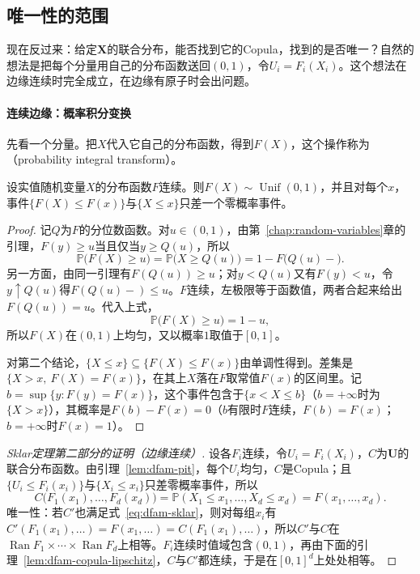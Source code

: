 \subsection{唯一性的范围}
\label{sec:dfam-copula-uniqueness}

现在反过来：给定$\bm{X}$的联合分布，能否找到它的Copula，找到的是否唯一？自然的想法是把每个分量用自己的分布函数送回$(0,1)$，令$U_i=F_i(X_i)$。这个想法在边缘连续时完全成立，在边缘有原子时会出问题。

\paragraph{连续边缘：概率积分变换}
先看一个分量。把$X$代入它自己的分布函数，得到$F(X)$，这个操作称为（probability integral transform）。

\begin{lemma}[概率积分变换]
\label{lem:dfam-pit}
设实值随机变量$X$的分布函数$F$连续。则$F(X)\sim\operatorname{Unif}(0,1)$，并且对每个$x$，事件$\{F(X)\leq F(x)\}$与$\{X\leq x\}$只差一个零概率事件。
\end{lemma}

\begin{proof}
记$Q$为$F$的分位数函数。对$u\in(0,1)$，由第~\ref{chap:random-variables}章的引理，$F(y)\geq u$当且仅当$y\geq Q(u)$，所以
\[
  \mathbb{P}\bigl(F(X)\geq u\bigr)=\mathbb{P}\bigl(X\geq Q(u)\bigr)=1-F\bigl(Q(u)-\bigr).
\]
另一方面，由同一引理有$F(Q(u))\geq u$；对$y<Q(u)$又有$F(y)<u$，令$y\uparrow Q(u)$得$F(Q(u)-)\leq u$。$F$连续，左极限等于函数值，两者合起来给出$F(Q(u))=u$。代入上式，
\[
  \mathbb{P}\bigl(F(X)\geq u\bigr)=1-u ,
\]
所以$F(X)$在$(0,1)$上均匀，又以概率$1$取值于$[0,1]$。

对第二个结论，$\{X\leq x\}\subseteq\{F(X)\leq F(x)\}$由单调性得到。差集是$\{X>x,\ F(X)=F(x)\}$，在其上$X$落在$F$取常值$F(x)$的区间里。记$b=\sup\{y:F(y)=F(x)\}$，这个事件包含于$\{x<X\leq b\}$（$b=+\infty$时为$\{X>x\}$），其概率是$F(b)-F(x)=0$（$b$有限时$F$连续，$F(b)=F(x)$；$b=+\infty$时$F(x)=1$）。
\end{proof}

\begin{proof}[Sklar定理第二部分的证明（边缘连续）]
设各$F_i$连续，令$U_i=F_i(X_i)$，$C$为$\bm{U}$的联合分布函数。由引理~\ref{lem:dfam-pit}，每个$U_i$均匀，$C$是Copula；且$\{U_i\leq F_i(x_i)\}$与$\{X_i\leq x_i\}$只差零概率事件，所以
\[
  C\bigl(F_1(x_1),\dots,F_d(x_d)\bigr)=\mathbb{P}(X_1\leq x_1,\dots,X_d\leq x_d)=F(x_1,\dots,x_d).
\]
唯一性：若$C'$也满足式~\eqref{eq:dfam-sklar}，则对每组$x_i$有$C'(F_1(x_1),\dots)=F(x_1,\dots)=C(F_1(x_1),\dots)$，所以$C'$与$C$在$\operatorname{Ran}F_1\times\cdots\times\operatorname{Ran}F_d$上相等。$F_i$连续时值域包含$(0,1)$，再由下面的引理~\ref{lem:dfam-copula-lipschitz}，$C$与$C'$都连续，于是在$[0,1]^{d}$上处处相等。
\end{proof}

